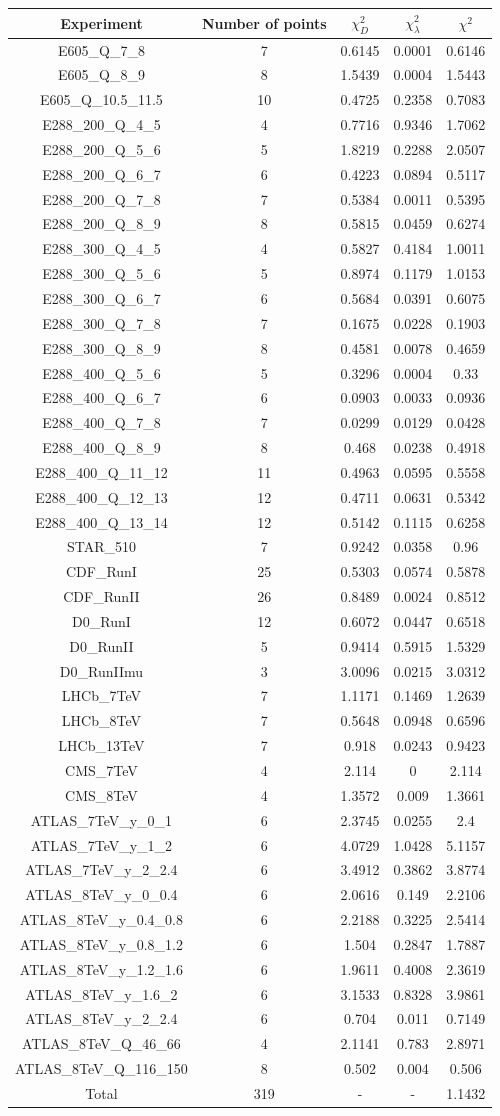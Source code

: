 \documentclass[
]{article}
\begin{document}
\begin{longtable}[]{@{}ccccc@{}}
\toprule
Experiment & Number of points & \(\chi_{D}^2\) & \(\chi_{\lambda}^2\) &
\(\chi^2\)\tabularnewline
\midrule
\endhead
E605\_Q\_7\_8 & 7 & 0.6145 & 0.0001 & 0.6146\tabularnewline
E605\_Q\_8\_9 & 8 & 1.5439 & 0.0004 & 1.5443\tabularnewline
E605\_Q\_10.5\_11.5 & 10 & 0.4725 & 0.2358 & 0.7083\tabularnewline
E288\_200\_Q\_4\_5 & 4 & 0.7716 & 0.9346 & 1.7062\tabularnewline
E288\_200\_Q\_5\_6 & 5 & 1.8219 & 0.2288 & 2.0507\tabularnewline
E288\_200\_Q\_6\_7 & 6 & 0.4223 & 0.0894 & 0.5117\tabularnewline
E288\_200\_Q\_7\_8 & 7 & 0.5384 & 0.0011 & 0.5395\tabularnewline
E288\_200\_Q\_8\_9 & 8 & 0.5815 & 0.0459 & 0.6274\tabularnewline
E288\_300\_Q\_4\_5 & 4 & 0.5827 & 0.4184 & 1.0011\tabularnewline
E288\_300\_Q\_5\_6 & 5 & 0.8974 & 0.1179 & 1.0153\tabularnewline
E288\_300\_Q\_6\_7 & 6 & 0.5684 & 0.0391 & 0.6075\tabularnewline
E288\_300\_Q\_7\_8 & 7 & 0.1675 & 0.0228 & 0.1903\tabularnewline
E288\_300\_Q\_8\_9 & 8 & 0.4581 & 0.0078 & 0.4659\tabularnewline
E288\_400\_Q\_5\_6 & 5 & 0.3296 & 0.0004 & 0.33\tabularnewline
E288\_400\_Q\_6\_7 & 6 & 0.0903 & 0.0033 & 0.0936\tabularnewline
E288\_400\_Q\_7\_8 & 7 & 0.0299 & 0.0129 & 0.0428\tabularnewline
E288\_400\_Q\_8\_9 & 8 & 0.468 & 0.0238 & 0.4918\tabularnewline
E288\_400\_Q\_11\_12 & 11 & 0.4963 & 0.0595 & 0.5558\tabularnewline
E288\_400\_Q\_12\_13 & 12 & 0.4711 & 0.0631 & 0.5342\tabularnewline
E288\_400\_Q\_13\_14 & 12 & 0.5142 & 0.1115 & 0.6258\tabularnewline
STAR\_510 & 7 & 0.9242 & 0.0358 & 0.96\tabularnewline
CDF\_RunI & 25 & 0.5303 & 0.0574 & 0.5878\tabularnewline
CDF\_RunII & 26 & 0.8489 & 0.0024 & 0.8512\tabularnewline
D0\_RunI & 12 & 0.6072 & 0.0447 & 0.6518\tabularnewline
D0\_RunII & 5 & 0.9414 & 0.5915 & 1.5329\tabularnewline
D0\_RunIImu & 3 & 3.0096 & 0.0215 & 3.0312\tabularnewline
LHCb\_7TeV & 7 & 1.1171 & 0.1469 & 1.2639\tabularnewline
LHCb\_8TeV & 7 & 0.5648 & 0.0948 & 0.6596\tabularnewline
LHCb\_13TeV & 7 & 0.918 & 0.0243 & 0.9423\tabularnewline
CMS\_7TeV & 4 & 2.114 & 0 & 2.114\tabularnewline
CMS\_8TeV & 4 & 1.3572 & 0.009 & 1.3661\tabularnewline
ATLAS\_7TeV\_y\_0\_1 & 6 & 2.3745 & 0.0255 & 2.4\tabularnewline
ATLAS\_7TeV\_y\_1\_2 & 6 & 4.0729 & 1.0428 & 5.1157\tabularnewline
ATLAS\_7TeV\_y\_2\_2.4 & 6 & 3.4912 & 0.3862 & 3.8774\tabularnewline
ATLAS\_8TeV\_y\_0\_0.4 & 6 & 2.0616 & 0.149 & 2.2106\tabularnewline
ATLAS\_8TeV\_y\_0.4\_0.8 & 6 & 2.2188 & 0.3225 & 2.5414\tabularnewline
ATLAS\_8TeV\_y\_0.8\_1.2 & 6 & 1.504 & 0.2847 & 1.7887\tabularnewline
ATLAS\_8TeV\_y\_1.2\_1.6 & 6 & 1.9611 & 0.4008 & 2.3619\tabularnewline
ATLAS\_8TeV\_y\_1.6\_2 & 6 & 3.1533 & 0.8328 & 3.9861\tabularnewline
ATLAS\_8TeV\_y\_2\_2.4 & 6 & 0.704 & 0.011 & 0.7149\tabularnewline
ATLAS\_8TeV\_Q\_46\_66 & 4 & 2.1141 & 0.783 & 2.8971\tabularnewline
ATLAS\_8TeV\_Q\_116\_150 & 8 & 0.502 & 0.004 & 0.506\tabularnewline
Total & 319 & - & - & 1.1432\tabularnewline
\bottomrule
\end{longtable}
\end{document}
